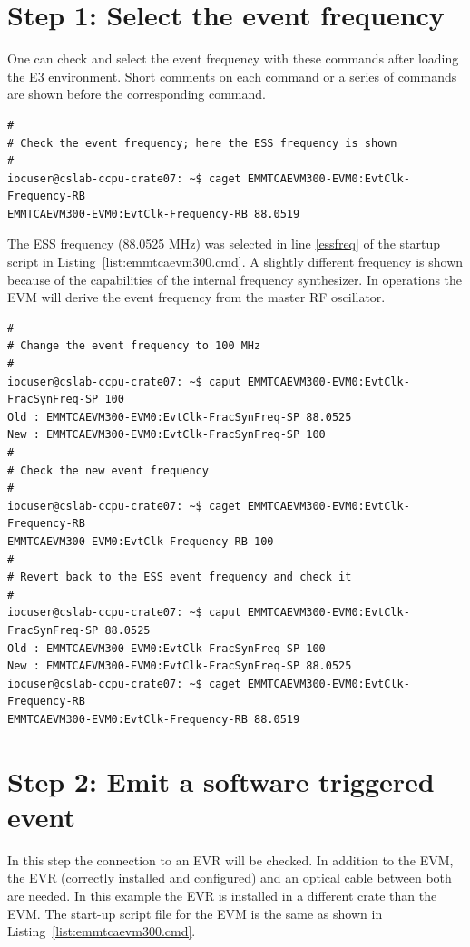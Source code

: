 \documentclass[11pt
  , a4paper
  , article
  , oneside
  , showtrims
]{memoir}
\begin{document}
\section{Step 1: Select the event frequency}
One can check and select the event frequency with these commands after loading the E3 environment. Short comments on each command or a series of commands are shown before the corresponding command.
\begin{lstlisting}[style=termstyle]
#
# Check the event frequency; here the ESS frequency is shown
#
iocuser@cslab-ccpu-crate07: ~$ caget EMMTCAEVM300-EVM0:EvtClk-Frequency-RB
EMMTCAEVM300-EVM0:EvtClk-Frequency-RB 88.0519
\end{lstlisting}
The ESS frequency (88.0525 MHz) was selected in line \ref{essfreq} of the startup script in Listing~\ref{list:emmtcaevm300.cmd}. A slightly different frequency is shown because of the capabilities of the internal frequency synthesizer. In operations the EVM will derive the event frequency from the master RF oscillator.
\begin{lstlisting}[style=termstyle]
#
# Change the event frequency to 100 MHz
#
iocuser@cslab-ccpu-crate07: ~$ caput EMMTCAEVM300-EVM0:EvtClk-FracSynFreq-SP 100
Old : EMMTCAEVM300-EVM0:EvtClk-FracSynFreq-SP 88.0525
New : EMMTCAEVM300-EVM0:EvtClk-FracSynFreq-SP 100
#
# Check the new event frequency
#
iocuser@cslab-ccpu-crate07: ~$ caget EMMTCAEVM300-EVM0:EvtClk-Frequency-RB
EMMTCAEVM300-EVM0:EvtClk-Frequency-RB 100
#
# Revert back to the ESS event frequency and check it
#
iocuser@cslab-ccpu-crate07: ~$ caput EMMTCAEVM300-EVM0:EvtClk-FracSynFreq-SP 88.0525
Old : EMMTCAEVM300-EVM0:EvtClk-FracSynFreq-SP 100
New : EMMTCAEVM300-EVM0:EvtClk-FracSynFreq-SP 88.0525
iocuser@cslab-ccpu-crate07: ~$ caget EMMTCAEVM300-EVM0:EvtClk-Frequency-RB
EMMTCAEVM300-EVM0:EvtClk-Frequency-RB 88.0519
\end{lstlisting}

\section{Step 2: Emit a software triggered event}
In this step the connection to an EVR will be checked. In addition to the EVM, the EVR (correctly installed and configured) and an optical cable between both are needed. In this example the EVR is installed in a different crate than the EVM. The start-up script file for the EVM is the same as shown in Listing~\ref{list:emmtcaevm300.cmd}.\\
\end{document}
